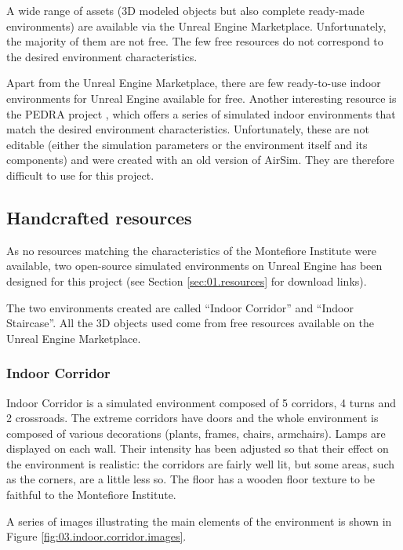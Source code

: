 A wide range of assets (3D modeled objects but also complete ready-made environments) are available via the Unreal Engine Marketplace. Unfortunately, the majority of them are not free. The few free resources do not correspond to the desired environment characteristics.

Apart from the Unreal Engine Marketplace, there are few ready-to-use indoor environments for Unreal Engine available for free. Another interesting resource is the PEDRA project \cite{anwar2020autonomous}, which offers a series of simulated indoor environments that match the desired environment characteristics. Unfortunately, these are not editable (either the simulation parameters or the environment itself and its components) and were created with an old version of AirSim. They are therefore difficult to use for this project.

\subsection{Handcrafted resources}

As no resources matching the characteristics of the Montefiore Institute were available, two open-source simulated environments on Unreal Engine has been designed for this project (see Section \ref{sec:01.resources} for download links).

The two environments created are called \enquote{Indoor Corridor} and \enquote{Indoor Staircase}. All the 3D objects used come from free resources available on the Unreal Engine Marketplace.

\subsubsection{Indoor Corridor}

Indoor Corridor is a simulated environment composed of 5 corridors, 4 turns and 2 crossroads. The extreme corridors have doors and the whole environment is composed of various decorations (plants, frames, chairs, armchairs). Lamps are displayed on each wall. Their intensity has been adjusted so that their effect on the environment is realistic: the corridors are fairly well lit, but some areas, such as the corners, are a little less so. The floor has a wooden floor texture to be faithful to the Montefiore Institute.

A series of images illustrating the main elements of the environment is shown in Figure \ref{fig:03.indoor.corridor.images}.

